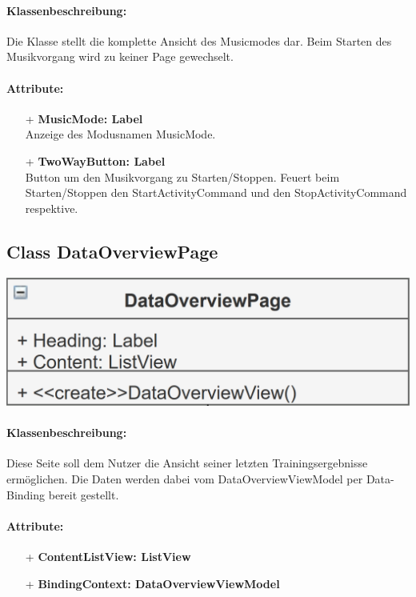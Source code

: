 \documentclass[a4paper,12pt]{article}
\begin{document}
\paragraph{Klassenbeschreibung:}
Die Klasse stellt die komplette Ansicht des Musicmodes dar. Beim Starten des Musikvorgang wird zu keiner Page gewechselt.
\paragraph{Attribute:}
	\begin{itemize}
	\item[+] \textbf{MusicMode: Label} \\ Anzeige des Modusnamen MusicMode.
	\item[+] \textbf{TwoWayButton: Label} \\ Button um den Musikvorgang zu Starten/Stoppen. Feuert beim Starten/Stoppen den StartActivityCommand und den StopActivityCommand respektive.
	\end{itemize}

	\begin{minipage}[t]{0.7\textwidth}	
		\subsection{Class DataOverviewPage}
	\end{minipage}
	\begin{minipage}[c]{0.3\textwidth}
		\includegraphics[width=\textwidth]{bilder/ViewKlassen/DataOverviewPage}
	\end{minipage}
		\paragraph{Klassenbeschreibung:}
		Diese Seite soll dem Nutzer die Ansicht seiner letzten Trainingsergebnisse ermöglichen.
		Die Daten werden dabei vom DataOverviewViewModel per Data-Binding bereit gestellt.
		\paragraph{Attribute:}
		\begin{itemize}
			\item[+] \textbf{ContentListView: ListView}
			\item[+] \textbf{BindingContext: DataOverviewViewModel} 
		\end{itemize}
\end{document}
